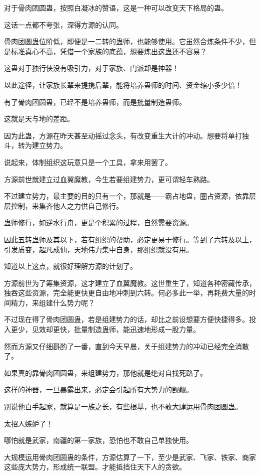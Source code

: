 \begin{this_body}
对于骨肉团圆蛊，按照白凝冰的赞语，这是一种可以改变天下格局的蛊。

这话一点都不夸张，深得方源的认同。

骨肉团圆蛊位阶低，即便是一二转的蛊师，也能够使用。它虽然合炼条件不少，但是标准真心不高，凭借一个家族的底蕴，想要炼出这蛊还不容易？

这蛊对于独行侠没有吸引力，对于家族、门派却是神器！

以此途径，让家族长辈来提携后辈，能将培养蛊师的时间、资金缩小多少倍！

有了骨肉团圆蛊，已经不是培养蛊师，而是批量制造蛊师。

这就是天与地的差距。

因为此蛊，方源在昨天甚至动摇过念头，有改变重生大计的冲动。想要将单打独斗，转为建立势力。

说起来，体制组织这玩意只是一个工具，拿来用罢了。

方源前世就建立过血翼魔教，今生若要组建势力，更可谓轻车熟路。

不过建立势力，最主要的目的只有一个，那就是――霸占地盘，圈占资源，依靠层层控制，来集齐他人之力供自己修行。

蛊师修行，如逆水行舟，更是个积累的过程，自然需要资源。

因此五转蛊师及其以下，若有组织的帮助，必定更易于修行。等到了六转及以上，引发质变，超凡成仙，天地伟力集中自身，那组织就没有用。

知道以上这点，就很好理解方源的计划了。

方源前世为了筹集资源，这才建立了血翼魔教。这世重生了，知道各种密藏传承，独吞这些资源，完全能更快更自由地冲刺到六转。何必多此一举，再耗费大量的时间精力，来组建什么势力呢？

不过现在得了骨肉团圆蛊，若是组建势力的话，却比之前设想要方便快捷得多。投入更少，见效却更快，批量制造蛊师，能迅速地形成一股力量。

然而方源又仔细斟酌了一番，直到今天早晨，关于组建势力的冲动已经完全消散了。

如果真的靠骨肉团圆蛊，来组建势力，那他就是绝对自找死路了。

这样的神器，一旦暴露出来，必定会引起所有大势力的觊觎。

别说他白手起家，就算是一族之长，有些根基，也不敢大肆运用骨肉团圆蛊。

太招人嫉妒了！

哪怕就是武家，南疆的第一家族，恐怕也不敢自己单独使用。

大规模运用骨肉团圆蛊的条件，方源估算了一下，至少是武家、飞家、铁家、商家这些庞大势力，形成统一联盟。才能抵挡住天下人的贪欲。


\end{this_body}
